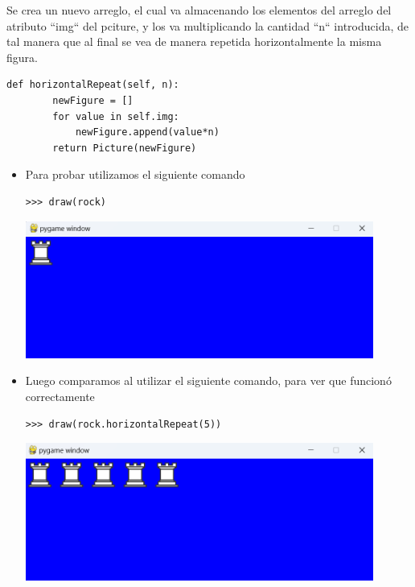 \documentclass{article}
\begin{document}
\begin{itemize}
  Se crea un nuevo arreglo, el cual va almacenando los elementos del arreglo del atributo ``img`` del pciture, y los va multiplicando la cantidad ``n`` introducida, de tal manera que al final se vea de manera repetida horizontalmente la misma figura.  
    
    \begin{lstlisting}[style=python]
    def horizontalRepeat(self, n):
        newFigure = []
        for value in self.img:
            newFigure.append(value*n)
        return Picture(newFigure)
    \end{lstlisting}

    \vspace{\baselineskip}

    \begin{itemize}
      \item Para probar utilizamos el siguiente comando

      \begin{lstlisting}[style=shell]
      >>> draw(rock)
      \end{lstlisting}
      \begin{minipage}{\linewidth}
        \centering
        \includegraphics[width=0.9\textwidth]{imagenes/p_horizontalr1.png}
      \end{minipage}

      \vspace{2\baselineskip}

      \item Luego comparamos al utilizar el siguiente comando, para ver que funcionó correctamente
      \begin{lstlisting}[style=shell]
      >>> draw(rock.horizontalRepeat(5))
      \end{lstlisting}
      \begin{minipage}{\linewidth}
        \centering
        \includegraphics[width=0.9\textwidth]{imagenes/p_horizontalr2.png}
      \end{minipage}
    \end{itemize}


\end{itemize}
\end{document}
